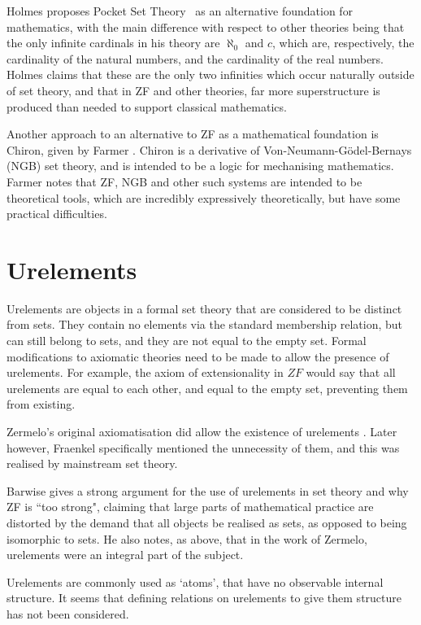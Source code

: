 \documentclass[11pt]{report}
\theoremstyle{definition}
\theoremstyle{theorem}
\theoremstyle{lemma}
\begin{document}
Holmes proposes Pocket Set Theory~\cite{pocket} as an alternative foundation for mathematics, with the main difference with respect to other theories being that the only infinite cardinals in his theory are $\aleph_0$ and $c$, which are, respectively, the cardinality of the natural numbers, and the cardinality of the real numbers.
Holmes claims that these are the only two infinities which occur naturally outside of set theory, and that in ZF and other theories, far more superstructure is produced than needed to support classical mathematics.

Another approach to an alternative to ZF as a mathematical foundation is Chiron, given by Farmer \cite{chiron}. Chiron is a derivative of Von-Neumann-G\"odel-Bernays (NGB) set theory, and is intended to be a logic for mechanising mathematics. Farmer notes that ZF, NGB and other such systems are intended to be theoretical tools, which are incredibly expressively theoretically, but have some practical difficulties.

\section{Urelements}
Urelements are objects in a formal set theory that are considered to be distinct from sets.
They contain no elements via the standard membership relation, but can still belong to sets, and they are not equal to the empty set. 
Formal modifications to axiomatic theories need to be made to allow the presence of urelements.
For example, the axiom of extensionality in $\mathit{ZF}$ would say that all urelements are equal to each other, and equal to the empty set, preventing them from existing. 

Zermelo's original axiomatisation did allow the existence of urelements \cite{zermelo}.
Later however, Fraenkel specifically mentioned the unnecessity of them, and this was realised by mainstream set theory.

Barwise \cite{barwise} gives a strong argument for the use of urelements in set theory and why ZF is ``too strong", claiming that large parts of mathematical practice are distorted by the demand that all objects be realised as sets, as opposed to being isomorphic to sets.
He also notes, as above, that in the work of Zermelo, urelements were an integral part of the subject.

Urelements are commonly used as `atoms', that have no observable internal structure.
It seems that defining relations on urelements to give them structure has not been considered.
\end{document}
